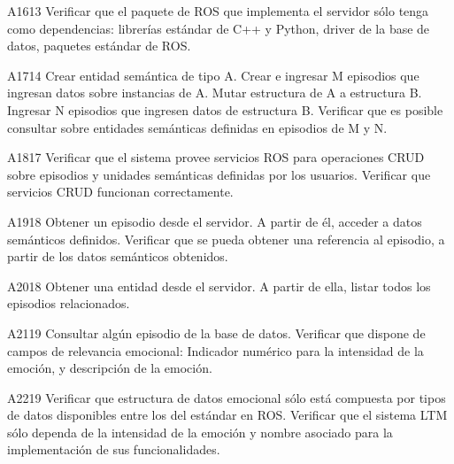 \begin{def-validacion}{A}{16}{13}
	Verificar que el paquete de ROS que implementa el servidor sólo tenga como dependencias: librerías estándar de C++ y Python, driver de la base de datos, paquetes estándar de ROS.	
\end{def-validacion}


\begin{def-validacion}{A}{17}{14}
	Crear entidad semántica de tipo A. Crear e ingresar M episodios que ingresan datos sobre  instancias de A. Mutar estructura de A a estructura B. Ingresar N episodios que ingresen datos de estructura B. Verificar que es posible consultar sobre entidades semánticas definidas en episodios de M y N.
\end{def-validacion}


\begin{def-validacion}{A}{18}{17}
	Verificar que el sistema provee servicios ROS para operaciones CRUD sobre episodios y unidades semánticas definidas por los usuarios. Verificar que servicios CRUD funcionan correctamente.
\end{def-validacion}

\begin{def-validacion}{A}{19}{18}
	Obtener un episodio desde el servidor. A partir de él, acceder a datos semánticos definidos. Verificar que se pueda obtener una referencia al episodio, a partir de los datos semánticos obtenidos.	
\end{def-validacion}

\begin{def-validacion}{A}{20}{18}
	Obtener una entidad desde el servidor. A partir de ella, listar todos los episodios relacionados.	
\end{def-validacion}

\begin{def-validacion}{A}{21}{19}
	Consultar algún episodio de la base de datos. Verificar que dispone de campos de relevancia emocional: Indicador numérico para la intensidad de la emoción, y descripción de la emoción.	
\end{def-validacion}

\begin{def-validacion}{A}{22}{19}
Verificar que estructura de datos emocional sólo está compuesta por tipos de datos disponibles entre los del estándar en ROS. Verificar que el sistema LTM sólo dependa de la intensidad de la emoción y nombre asociado para la implementación de sus funcionalidades.	
\end{def-validacion}

